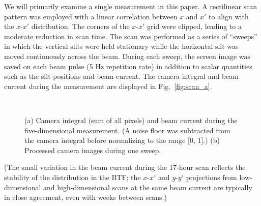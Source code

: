 \documentclass[%
 reprint,
 amsmath,amssymb,
 aps,
prstab,
]{revtex4-2}
\begin{document}
We will primarily examine a single measurement in this paper. A rectilinear scan pattern was employed with a linear correlation between $x$ and $x'$ to align with the $x$-$x'$ distribution. The corners of the $x$-$x'$ grid were clipped, leading to a moderate reduction in scan time. The scan was performed as a series of ``sweeps'' in which the vertical slits were held stationary while the horizontal slit was moved continuously across the beam. During each sweep, the screen image was saved on each beam pulse (5 Hz repetition rate) in addition to scalar quantities such as the slit positions and beam current. The camera integral and beam current during the measurement are displayed in Fig.~\ref{fig:scan_a}.
%
\begin{figure}
     \\
    \caption[]{(a) Camera integral (sum of all pixels) and beam current during the five-dimensional measurement. (A noise floor was subtracted from the camera integral before normalizing to the range [0, 1].) (b) Processed camera images during one sweep.}%
    \label{fig:scan}%
\end{figure}
%
(The small variation in the beam current during the 17-hour scan reflects the stability of the distribution in the BTF; the $x$-$x'$ and $y$-$y'$ projections from low-dimensional and high-dimensional scans at the same beam current are typically in close agreement, even with weeks between scans.)
\end{document}
